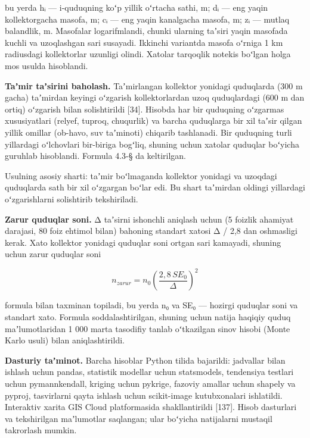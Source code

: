 bu yerda hᵢ --- i-quduqning koʻp yillik oʻrtacha sathi, m; dᵢ --- eng
yaqin kollektorgacha masofa, m; cᵢ --- eng yaqin kanalgacha masofa, m;
zᵢ --- mutlaq balandlik, m. Masofalar logarifmlandi, chunki ularning
taʼsiri yaqin masofada kuchli va uzoqlashgan sari susayadi. Ikkinchi
variantda masofa oʻrniga 1 km radiusdagi kollektorlar uzunligi olindi.
Xatolar tarqoqlik notekis boʻlgan holga mos usulda hisoblandi.

\textbf{Taʼmir taʼsirini baholash.} Taʼmirlangan kollektor yonidagi
quduqlarda (300 m gacha) taʼmirdan keyingi oʻzgarish kollektorlardan
uzoq quduqlardagi (600 m dan ortiq) oʻzgarish bilan solishtirildi
{[}34{]}. Hisobda har bir quduqning oʻzgarmas xususiyatlari (relyef,
tuproq, chuqurlik) va barcha quduqlarga bir xil taʼsir qilgan yillik
omillar (ob-havo, suv taʼminoti) chiqarib tashlanadi. Bir quduqning
turli yillardagi oʻlchovlari bir-biriga bogʻliq, shuning uchun xatolar
quduqlar boʻyicha guruhlab hisoblandi. Formula 4.3-§ da keltirilgan.

Usulning asosiy sharti: taʼmir boʻlmaganda kollektor yonidagi va
uzoqdagi quduqlarda sath bir xil oʻzgargan boʻlar edi. Bu shart
taʼmirdan oldingi yillardagi oʻzgarishlarni solishtirib tekshiriladi.

\textbf{Zarur quduqlar soni.} Δ taʼsirni ishonchli aniqlash uchun (5
foizlik ahamiyat darajasi, 80 foiz ehtimol bilan) bahoning standart
xatosi Δ / 2,8 dan oshmasligi kerak. Xato kollektor yonidagi quduqlar
soni ortgan sari kamayadi, shuning uchun zarur quduqlar soni

\begin{equation}\tag{2.11}
n_{zarur} = n_0 \left( \frac{2{,}8 \, SE_0}{\Delta} \right)^2
\end{equation}

formula bilan taxminan topiladi, bu yerda n₀ va SE₀ --- hozirgi quduqlar
soni va standart xato. Formula soddalashtirilgan, shuning uchun natija
haqiqiy quduq maʼlumotlaridan 1 000 marta tasodifiy tanlab oʻtkazilgan
sinov hisobi (Monte Karlo usuli) bilan aniqlashtirildi.

\textbf{Dasturiy taʼminot.} Barcha hisoblar Python tilida bajarildi:
jadvallar bilan ishlash uchun pandas, statistik modellar uchun
statsmodels, tendensiya testlari uchun pymannkendall, kriging uchun
pykrige, fazoviy amallar uchun shapely va pyproj, tasvirlarni qayta
ishlash uchun scikit-image kutubxonalari ishlatildi. Interaktiv xarita
GIS Cloud platformasida shakllantirildi {[}137{]}. Hisob dasturlari va
tekshirilgan maʼlumotlar saqlangan; ular boʻyicha natijalarni mustaqil
takrorlash mumkin.

